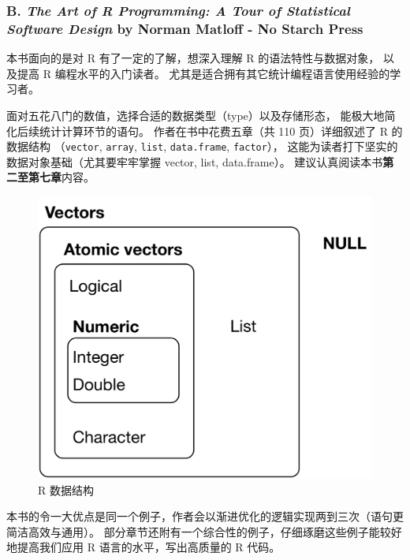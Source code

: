 \documentclass[11pt,hyperref]{ctexart}
\begin{document}
\hypertarget{b.-the-art-of-r-programming-a-tour-of-statistical-software-design-by-norman-matloff---no-starch-press}{%
\subsubsection{\texorpdfstring{B. \emph{The Art of R Programming: A Tour
of Statistical Software Design} by Norman Matloff - No Starch
Press}{B. The Art of R Programming: A Tour of Statistical Software Design by Norman Matloff - No Starch Press}}\label{b.-the-art-of-r-programming-a-tour-of-statistical-software-design-by-norman-matloff---no-starch-press}}

本书面向的是对 R 有了一定的了解，想深入理解 R 的语法特性与数据对象，
以及提高 R 编程水平的入门读者。
尤其是适合拥有其它统计编程语言使用经验的学习者。

面对五花八门的数值，选择合适的数据类型（type）以及存储形态，
能极大地简化后续统计计算环节的语句。 作者在书中花费五章（共 110
页）详细叙述了 R 的数据结构 （\texttt{vector}, \texttt{array},
\texttt{list}, \texttt{data.frame}, \texttt{factor}），
这能为读者打下坚实的数据对象基础（尤其要牢牢掌握 vector, list,
data.frame）。 建议认真阅读本书\textbf{第二至第七章}内容。

\begin{figure}
\centering
\includegraphics{images/data-structures.png}
\caption{R 数据结构}
\end{figure}

本书的令一大优点是同一个例子，作者会以渐进优化的逻辑实现两到三次（语句更简洁高效与通用）。
部分章节还附有一个综合性的例子，仔细琢磨这些例子能较好地提高我们应用 R
语言的水平，写出高质量的 R 代码。
\end{document}

